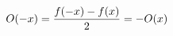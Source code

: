 \documentclass[preview]{standalone}
\begin{document}
\begin{align*}
\special{dvisvgm:raw <g id='unique000'>}O(-x)=\frac{f(-x)-f(x)}{2}=-O(x)\special{dvisvgm:raw </g>}
\end{align*}
\end{document}
